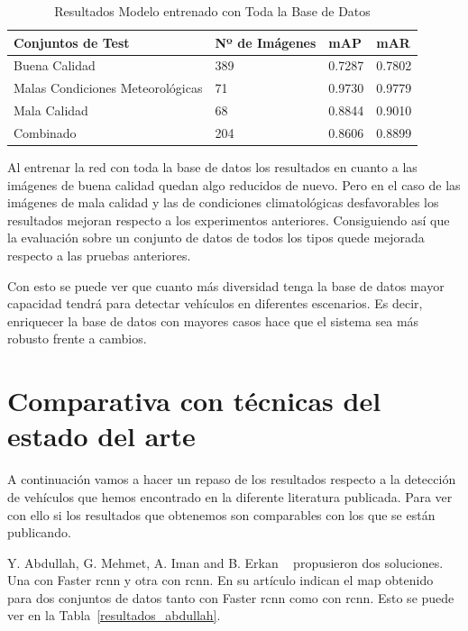 \begin{table}[H] 
\begin{center}
\begin{tabular}{|l|l|l|l|}
\hline
 Conjuntos de Test & Nº de Imágenes & mAP & mAR  \\ 
\hline \hline
Buena Calidad & 389 & 0.7287 & 0.7802 \\ \hline
Malas Condiciones Meteorológicas & 71 & 0.9730 & 0.9779 \\ \hline
Mala Calidad  & 68 & 0.8844 & 0.9010\\ \hline
Combinado & 204 & 0.8606 & 0.8899\\ \hline
\end{tabular}
\caption{Resultados Modelo entrenado con Toda la Base de Datos}
\label{resultados_test_todas_img}
\end{center}
\end{table}

Al entrenar la red con toda la base de datos los resultados en cuanto a las imágenes de buena calidad quedan algo reducidos de nuevo. Pero en el caso de las imágenes de mala calidad y las de condiciones climatológicas desfavorables los resultados mejoran respecto  a los experimentos anteriores. Consiguiendo así que la evaluación sobre un conjunto de datos de todos los tipos quede mejorada respecto a las pruebas anteriores. 

Con esto se puede ver que cuanto más diversidad tenga la base de datos mayor capacidad tendrá para detectar vehículos en diferentes escenarios. Es decir, enriquecer la base de datos con mayores casos hace que el sistema sea más robusto frente a cambios. 

\section{Comparativa con técnicas del estado del arte}
A continuación vamos a hacer un repaso de los resultados respecto a la detección de vehículos que hemos encontrado en la diferente literatura publicada. Para ver con ello si los resultados que obtenemos son comparables con los que se están publicando.

Y. Abdullah, G. Mehmet, A. Iman and B. Erkan ~\cite{rcnn_detection} propusieron dos soluciones. Una con Faster \acrshort{rcnn} y otra con \acrshort{rcnn}. En su artículo indican el \acrshort{map} obtenido para dos conjuntos de datos tanto con Faster \acrshort{rcnn} como con \acrshort{rcnn}. Esto se puede ver en la Tabla~\ref{resultados_abdullah}.

